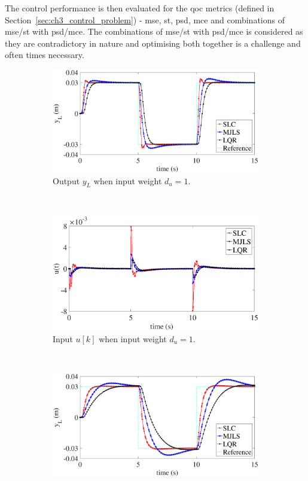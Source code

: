 The control performance is then evaluated for the \gls{qoc} metrics (defined in Section~\ref{sec:ch3_control_problem}) - \gls{mse}, \gls{st}, \gls{psd}, \gls{mce} and combinations of \gls{mse}/\gls{st} with \gls{psd}/\gls{mce}. The combinations of \gls{mse}/\gls{st} with \gls{psd}/\gls{mce} is considered as they are contradictory in nature and optimising both together is a challenge and often times necessary.
\begin{figure}[t!]
    \centering
    \begin{subfigure}[t]{0.5\textwidth}
        \centering
        \includegraphics[width=\textwidth]{images/res_yL_R1.eps}
        \caption{Output $y_L$ when input weight $d_u=1$.}
    \end{subfigure}%
    ~ 
    \begin{subfigure}[t]{0.5\textwidth}
        \centering
       \includegraphics[width=\textwidth]{images/res_u_R1.eps}
       \caption{Input $u[k]$ when input weight $d_u=1$.}
    \end{subfigure}
    ~ 
    \begin{subfigure}[t]{0.5\textwidth}
        \centering
        \includegraphics[width=\textwidth]{images/res_yL_R10.eps}

\end{subfigure}
\end{figure}
